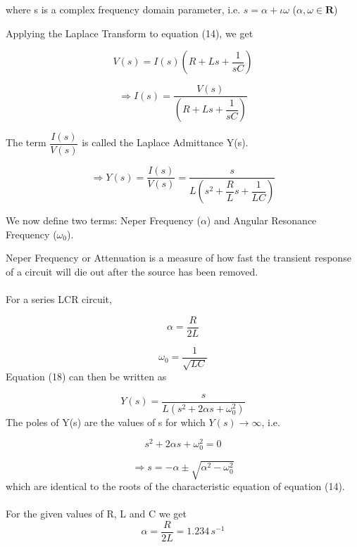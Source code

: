 \documentclass[journal,12pt,twocolumn]{IEEEtran}
\theoremstyle{remark}
\begin{document}
where s is a complex frequency domain parameter, i.e. $s = \alpha + \iota\omega$ ($\alpha, \omega \in \mathbf{R}$)

Applying the Laplace Transform to equation (14), we get

\begin{equation}
    V(s) = I(s)\left(R + Ls + \dfrac{1}{sC}\right)
\end{equation}

\begin{equation}
    \Rightarrow I(s) = \dfrac{V(s)}{\left(R + Ls + \dfrac{1}{sC}\right)}
\end{equation}

The term $\dfrac{I(s)}{V(s)}$ is called the Laplace Admittance Y(s).

\begin{equation}
     \Rightarrow Y(s) = \dfrac{I(s)}{V(s)} = \dfrac{s}{L\left(s^2 + \dfrac{R}{L}s + \dfrac{1}{LC}\right)}
\end{equation}

We now define two terms: Neper Frequency ($\alpha$) and Angular Resonance Frequency ($\omega_0$).

Neper Frequency or Attenuation is a measure of how fast the transient response of a circuit will die out after the source has been removed.\\
\\
For a series LCR circuit,

\begin{equation}
    \alpha = \dfrac{R}{2L}
\end{equation}

\begin{equation}
    \omega_0 = \dfrac{1}{\sqrt{LC}}
\end{equation}
Equation (18) can then be written as

\begin{equation}
    Y(s) = \dfrac{s}{L\left(s^2 + 2\alpha s + \omega_0^2\right)}
\end{equation}
The poles of Y(s) are the values of s for which $Y(s) \rightarrow \infty$, i.e.

\begin{equation}
    s^2 + 2\alpha s + \omega_0^2 = 0
\end{equation}

\begin{equation}
    \Rightarrow s = -\alpha \pm \sqrt{\alpha^2 - \omega_0^2}
\end{equation}
which are identical to the roots of the characteristic equation of equation (14).\\
\\
For the given values of R, L and C we get
\begin{equation}
    \alpha = \dfrac{R}{2L} = 1.234\,  s^{-1}
\end{equation}
\end{document}
